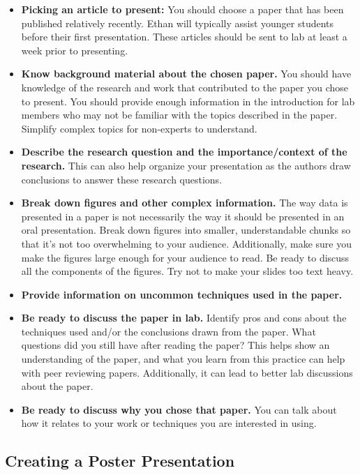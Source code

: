 \documentclass[
]{book}
\begin{document}
\begin{itemize}
\item
  \textbf{Picking an article to present:} You should choose a paper that has been published relatively recently. Ethan will typically assist younger students before their first presentation. These articles should be sent to lab at least a week prior to presenting.
\item
  \textbf{Know background material about the chosen paper.} You should have knowledge of the research and work that contributed to the paper you chose to present. You should provide enough information in the introduction for lab members who may not be familiar with the topics described in the paper. Simplify complex topics for non-experts to understand.
\item
  \textbf{Describe the research question and the importance/context of the research.} This can also help organize your presentation as the authors draw conclusions to answer these research questions.
\item
  \textbf{Break down figures and other complex information.} The way data is presented in a paper is not necessarily the way it should be presented in an oral presentation. Break down figures into smaller, understandable chunks so that it's not too overwhelming to your audience. Additionally, make sure you make the figures large enough for your audience to read. Be ready to discuss all the components of the figures. Try not to make your slides too text heavy.
\item
  \textbf{Provide information on uncommon techniques used in the paper.}
\item
  \textbf{Be ready to discuss the paper in lab.} Identify pros and cons about the techniques used and/or the conclusions drawn from the paper. What questions did you still have after reading the paper? This helps show an understanding of the paper, and what you learn from this practice can help with peer reviewing papers. Additionally, it can lead to better lab discussions about the paper.
\item
  \textbf{Be ready to discuss why you chose that paper.} You can talk about how it relates to your work or techniques you are interested in using.
\end{itemize}

\hypertarget{creating-a-poster-presentation}{%
\subsection{Creating a Poster Presentation}\label{creating-a-poster-presentation}}
\end{document}
